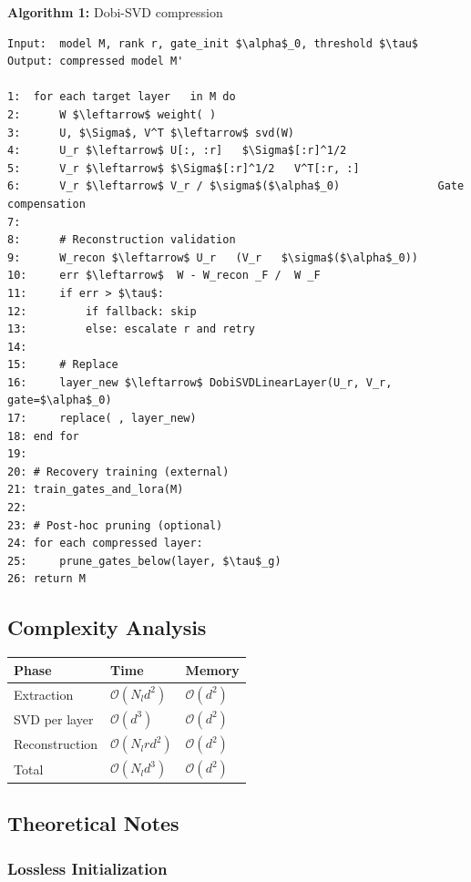 \textbf{Algorithm 1:} Dobi-SVD compression
\begin{lstlisting}
Input:  model M, rank r, gate_init $\alpha$_0, threshold $\tau$
Output: compressed model M'

1:  for each target layer   in M do
2:      W $\leftarrow$ weight( )
3:      U, $\Sigma$, V^T $\leftarrow$ svd(W)
4:      U_r $\leftarrow$ U[:, :r]   $\Sigma$[:r]^1/2
5:      V_r $\leftarrow$ $\Sigma$[:r]^1/2   V^T[:r, :]
6:      V_r $\leftarrow$ V_r / $\sigma$($\alpha$_0)               Gate compensation
7:
8:      # Reconstruction validation
9:      W_recon $\leftarrow$ U_r   (V_r   $\sigma$($\alpha$_0))
10:     err $\leftarrow$  W - W_recon _F /  W _F
11:     if err > $\tau$:
12:         if fallback: skip  
13:         else: escalate r and retry
14:
15:     # Replace
16:     layer_new $\leftarrow$ DobiSVDLinearLayer(U_r, V_r, gate=$\alpha$_0)
17:     replace( , layer_new)
18: end for
19:
20: # Recovery training (external)
21: train_gates_and_lora(M)
22:
23: # Post-hoc pruning (optional)
24: for each compressed layer:
25:     prune_gates_below(layer, $\tau$_g)
26: return M
\end{lstlisting}

\subsection{Complexity Analysis}

\begin{table}[H]
\centering
\small
\begin{tabular}{lll}
\toprule
\textbf{Phase} & \textbf{Time} & \textbf{Memory} \\
\midrule
Extraction & $\mathcal{O}(N_l d^2)$ & $\mathcal{O}(d^2)$ \\
SVD per layer & $\mathcal{O}(d^3)$ & $\mathcal{O}(d^2)$ \\
Reconstruction & $\mathcal{O}(N_l r d^2)$ & $\mathcal{O}(d^2)$ \\
Total & $\mathcal{O}(N_l d^3)$ & $\mathcal{O}(d^2)$ \\
\bottomrule
\end{tabular}
\end{table}

\subsection{Theoretical Notes}

\subsubsection{Lossless Initialization}

